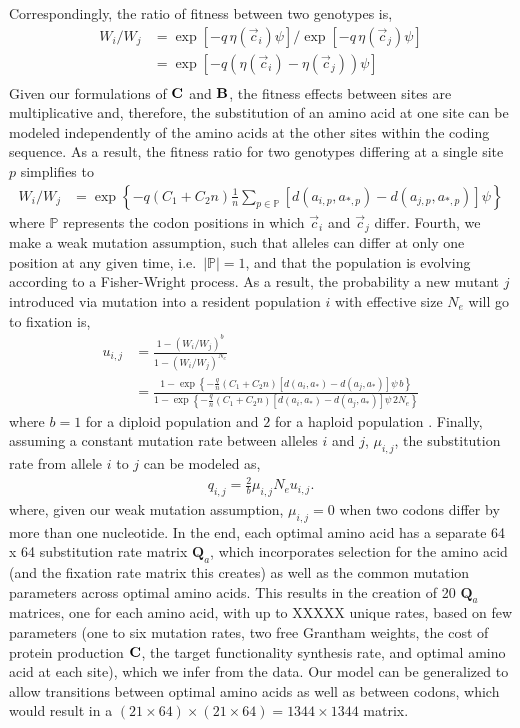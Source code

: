 \documentclass{article}
\newcommand{\Cost}{\ensuremath{\text{\textbf{C}}}\xspace}
\newcommand{\Func}{\ensuremath{\text{\textbf{B}}}\xspace}
\newcommand{\Ne}{\ensuremath{{N_e}}\xspace} %
\newcommand{\Qmatrix}{\mathbf{Q}\xspace}
\newcommand{\Qmatrixa}{\ensuremath{\Qmatrix_a}\xspace}
\newcommand{\aip}{\ensuremath{a_{i,p}}\xspace}
\newcommand{\ajp}{\ensuremath{a_{j,p}}\xspace}
\newcommand{\aopt}{\ensuremath{a_*}\xspace}
\newcommand{\aoptp}{\ensuremath{a_{*,p}}\xspace}
\newcommand{\cveci}{\ensuremath{\cvec_i}\xspace}
\newcommand{\cvecj}{\ensuremath{\cvec_j}\xspace}
\newcommand{\cvec}{\ensuremath{\Vec{c}}\xspace}
\newcommand{\muij}{\ensuremath{\mu_{i,j}}\xspace}
\newcommand{\setP}{\ensuremath{\mathbb{P}}\xspace}
\begin{document}
Correspondingly, the ratio of fitness between two genotypes is,
\begin{align*}
  W_i/W_j &=  \exp\left[- q \, \eta(\cveci) \psi\right]/\exp\left[- q \, \eta(\cvecj) \psi\right]\\
  &=  \exp\left[- q \left(\eta(\cveci)- \eta(\cvecj)\right) \psi\right]\\
\end{align*}
Given our formulations of \Cost and \Func, the fitness effects between sites are multiplicative and, therefore, the substitution of an amino acid at one site can be modeled independently of the amino acids at the other sites within the coding sequence.
As a result, the fitness ratio for two genotypes differing at a single site $p$ simplifies to
\begin{align}
 W_i/W_j  &= \exp\left\{- q \left(C_1 + C_2 n\right) \frac{1}{n} \sum_{p \in \setP} \left[d\left(\aip,\aoptp\right) - d\left(\ajp,\aoptp\right)\right] \psi \right\}
\end{align}
where \setP represents the codon positions in which \cveci and \cvecj differ.
Fourth, we make a weak mutation assumption, such that alleles can differ at only one position at any given time, i.e.~$|\setP| = 1$, and that the population is evolving according to a Fisher-Wright process.
As a result, the probability a new mutant $j$ introduced via mutation into a resident population $i$ with effective size \Ne will go to fixation is,
\begin{align*}
  u_{i,j} &=  \frac{1 - \left(W_i/W_j\right)^b}{1 - \left(W_i/W_j\right)^\Ne}\\
   &= \frac{1- \exp\left\{- \frac{q}{n} \left(C_1 + C_2 n\right) \left[d\left(a_i,\aopt\right) - d\left(a_j,\aopt\right)\right] \psi \,  b\right\}}  {1-\exp\left\{- \frac{q}{n} \left(C_1 + C_2 n\right) \left[d\left(a_i,\aopt\right) - d\left(a_j,\aopt\right)\right] \psi \, 2\Ne\right\}}
\end{align*}
where $b=1$ for a diploid population and $2$ for a haploid population \citep{Kimura1962,Wright1969,Iwasa1988,BergAndLassig2003,SellaAndHirsh2005}.
Finally, assuming a constant mutation rate between alleles $i$ and $j$, $\muij$, the substitution rate from allele $i$ to $j$ can be modeled as,
\begin{align*}
  q_{i,j} = \frac{2}{b} \muij \Ne u_{i,j}.
\end{align*}
where, given our weak mutation assumption, $\muij = 0$ when two codons differ by more than one nucleotide.
In the end, each optimal amino acid has a separate 64 x 64 substitution rate matrix \Qmatrixa, which incorporates selection for the amino acid (and the fixation rate matrix this creates) as well as the common mutation parameters across optimal amino acids. 
This results in the creation of 20  \Qmatrixa  matrices, one for each amino acid, with up to XXXXX unique rates, based on few parameters (one to six mutation rates, two free Grantham weights, the cost of protein production \Cost, the target functionality synthesis rate, and optimal amino acid at each site), which we infer from the data.
Our model can be generalized to allow  transitions between optimal amino acids as well as between codons, which would result in a $(21 \times 64) \times (21 \times 64) =  1344 \times 1344$ matrix. 
\end{document}

